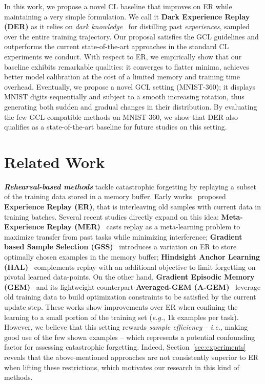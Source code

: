 \documentclass{article}
\begin{document}
In this work, we propose a novel CL baseline that improves on ER while maintaining a very simple formulation. We call it \textbf{Dark Experience Replay (DER)} as it relies on \textit{dark knowledge}~\cite{hinton2014dark} for distilling past \textit{experiences}, sampled over the entire training trajectory. Our proposal satisfies the GCL guidelines and outperforms the current state-of-the-art approaches in the standard CL experiments we conduct. With respect to ER, we empirically show that our baseline exhibits remarkable qualities: it converges to flatter minima, achieves better model calibration at the cost of a limited memory and training time overhead. Eventually, we propose a novel GCL setting (MNIST-360); it displays MNIST digits sequentially and subject to a smooth increasing rotation, thus generating both sudden and gradual changes in their distribution. By evaluating the few GCL-compatible methods on MNIST-360, we show that DER also qualifies as a state-of-the-art baseline for future studies on this setting. \section{Related Work} \label{sec:related}
\textit{\textbf{Rehearsal-based methods}} tackle catastrophic forgetting by replaying a subset of the training data stored in a memory buffer. Early works~\cite{ratcliff1990connectionist,robins1995catastrophic} proposed \textbf{Experience Replay (ER)}, that is interleaving old samples with current data in training batches. Several recent studies directly expand on this idea: \textbf{Meta-Experience Replay (MER)}~\cite{riemer2018learning} casts replay as a meta-learning problem to maximize transfer from past tasks while minimizing interference; \textbf{Gradient based Sample Selection (GSS)}~\cite{aljundi2019gradient} introduces a variation on ER to store optimally chosen examples in the memory buffer; \textbf{Hindsight Anchor Learning (HAL)}~\cite{chaudhry2020using} complements replay with an additional objective to limit forgetting on pivotal learned data-points. On the other hand, \textbf{Gradient Episodic Memory (GEM)}~\cite{lopez2017gradient} and its lightweight counterpart \textbf{Averaged-GEM (A-GEM)}~\cite{chaudhry2018efficient} leverage old training data to build optimization constraints to be satisfied by the current update step. These works show improvements over ER when confining the learning to a small portion of the training set (\textit{e.g.}, 1k examples per task). However, we believe that this setting rewards \textit{sample efficiency} -- \textit{i.e.}, making good use of the few shown examples -- which represents a potential confounding factor for assessing catastrophic forgetting. Indeed, Section~\ref{sec:experiments} reveals that the above-mentioned approaches are not consistently superior to ER when lifting these restrictions, which motivates our research in this kind of methods.
\end{document}
